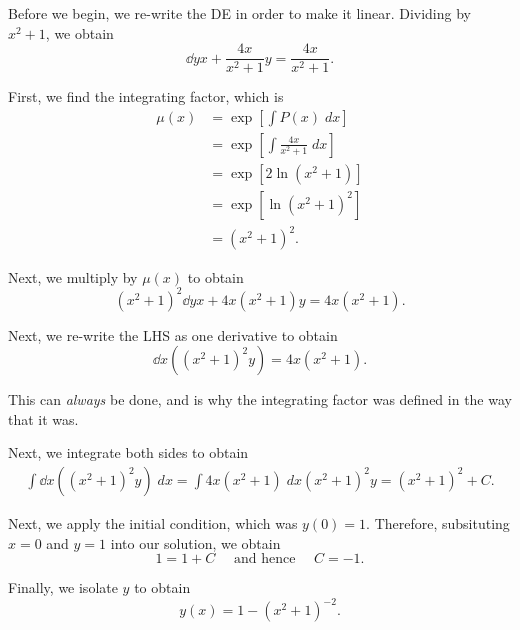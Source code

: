 \documentclass{book}
\begin{document}
\begin{solution}
  Before we begin, we re-write the DE in order to make it linear.
  Dividing by $x^2 + 1$, we obtain
  \begin{equation*}
    \dd{y}{x} + \frac{4x}{x^2 + 1} y = \frac{4x}{x^2 + 1}.
  \end{equation*}


  First, we find the integrating factor, which is
  \begin{align*}
    \mu(x) &= \exp\left[ \int P(x) \;dx \right] \\
           &= \exp\left[ \int \frac{4x}{x^2 + 1} \;dx \right] \\
           &= \exp\left[ 2 \ln (x^2 + 1) \right] \\
           &= \exp\left[ \ln (x^2 + 1)^2 \right] \\
           &= (x^2 + 1)^2.
  \end{align*}


  Next, we multiply by $\mu(x)$ to obtain
  \begin{equation*}
    (x^2 + 1)^2 \dd{y}{x} + 4x (x^2 + 1)  y = 4x (x^2 + 1).
  \end{equation*}


  Next, we re-write the LHS as one derivative to obtain
  \begin{equation*}
    \dd{}{x} \left( (x^2 + 1)^2 y \right) = 4x (x^2 + 1).
  \end{equation*}

  \begin{heads}
    This can \emph{always} be done, and is why the integrating factor
    was defined in the way that it was.
  \end{heads}


  Next, we integrate both sides to obtain
  \begin{gather*}
    \int \dd{}{x} \left( (x^2 + 1)^2 y \right) \;dx = \int 4x (x^2 + 1) \; dx
    (x^2 + 1)^2 y = (x^2 + 1)^2 + C.
  \end{gather*}


  Next, we apply the initial condition, which was $y(0) = 1$.
  Therefore, subsituting $x=0$ and $y=1$ into our solution, we obtain
  \begin{equation*}
    1 = 1 + C \quad \text{ and hence } \quad C = -1.
  \end{equation*}


  Finally, we isolate $y$ to obtain
  \begin{equation*}
    y(x) = 1 - (x^2 + 1)^{-2}.
  \end{equation*}
\end{solution}
\end{document}
